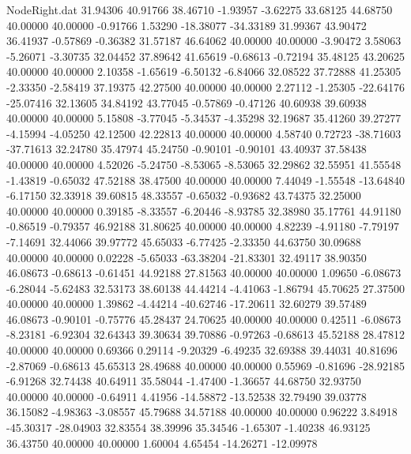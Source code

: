 \begin{filecontents}{NodeRight.dat}
  31.94306   40.91766   38.46710    -1.93957   -3.62275   33.68125   44.68750   40.00000   40.00000   -0.91766    1.53290  -18.38077  -34.33189
  31.99367   43.90472   36.41937    -0.57869   -0.36382   31.57187   46.64062   40.00000   40.00000   -3.90472    3.58063   -5.26071   -3.30735
  32.04452   37.89642   41.65619    -0.68613   -0.72194   35.48125   43.20625   40.00000   40.00000    2.10358   -1.65619   -6.50132   -6.84066
  32.08522   37.72888   41.25305    -2.33350   -2.58419   37.19375   42.27500   40.00000   40.00000    2.27112   -1.25305  -22.64176  -25.07416
  32.13605   34.84192   43.77045    -0.57869   -0.47126   40.60938   39.60938   40.00000   40.00000    5.15808   -3.77045   -5.34537   -4.35298
  32.19687   35.41260   39.27277    -4.15994   -4.05250   42.12500   42.22813   40.00000   40.00000    4.58740    0.72723  -38.71603  -37.71613
  32.24780   35.47974   45.24750    -0.90101   -0.90101   43.40937   37.58438   40.00000   40.00000    4.52026   -5.24750   -8.53065   -8.53065
  32.29862   32.55951   41.55548    -1.43819   -0.65032   47.52188   38.47500   40.00000   40.00000    7.44049   -1.55548  -13.64840   -6.17150
  32.33918   39.60815   48.33557    -0.65032   -0.93682   43.74375   32.25000   40.00000   40.00000    0.39185   -8.33557   -6.20446   -8.93785
  32.38980   35.17761   44.91180    -0.86519   -0.79357   46.92188   31.80625   40.00000   40.00000    4.82239   -4.91180   -7.79197   -7.14691
  32.44066   39.97772   45.65033    -6.77425   -2.33350   44.63750   30.09688   40.00000   40.00000    0.02228   -5.65033  -63.38204  -21.83301
  32.49117   38.90350   46.08673    -0.68613   -0.61451   44.92188   27.81563   40.00000   40.00000    1.09650   -6.08673   -6.28044   -5.62483
  32.53173   38.60138   44.44214    -4.41063   -1.86794   45.70625   27.37500   40.00000   40.00000    1.39862   -4.44214  -40.62746  -17.20611
  32.60279   39.57489   46.08673    -0.90101   -0.75776   45.28437   24.70625   40.00000   40.00000    0.42511   -6.08673   -8.23181   -6.92304
  32.64343   39.30634   39.70886    -0.97263   -0.68613   45.52188   28.47812   40.00000   40.00000    0.69366    0.29114   -9.20329   -6.49235
  32.69388   39.44031   40.81696    -2.87069   -0.68613   45.65313   28.49688   40.00000   40.00000    0.55969   -0.81696  -28.92185   -6.91268
  32.74438   40.64911   35.58044    -1.47400   -1.36657   44.68750   32.93750   40.00000   40.00000   -0.64911    4.41956  -14.58872  -13.52538
  32.79490   39.03778   36.15082    -4.98363   -3.08557   45.79688   34.57188   40.00000   40.00000    0.96222    3.84918  -45.30317  -28.04903
  32.83554   38.39996   35.34546    -1.65307   -1.40238   46.93125   36.43750   40.00000   40.00000    1.60004    4.65454  -14.26271  -12.09978

\end{filecontents}
